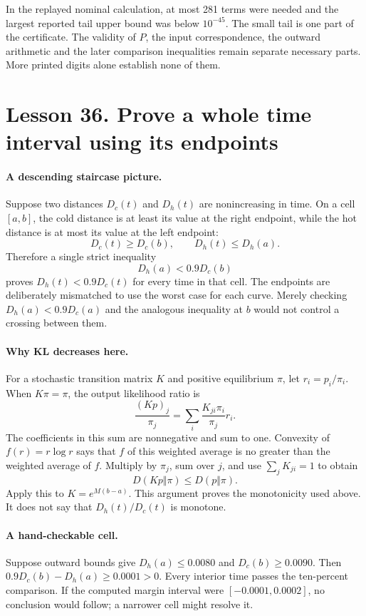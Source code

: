 \documentclass[11pt]{article}
\begin{document}
In the replayed nominal calculation, at most 281 terms were needed and the
largest reported tail upper bound was below $10^{-45}$. The small tail is
one part of the certificate. The validity of $P$, the input correspondence,
the outward arithmetic and the later comparison inequalities remain
separate necessary parts. More printed digits alone establish none of them.

\section*{Lesson 36. Prove a whole time interval using its endpoints}
\paragraph{A descending staircase picture.}
Suppose two distances $D_c(t)$ and $D_h(t)$ are nonincreasing in time.
On a cell $[a,b]$, the cold distance is at least its value at the right
endpoint, while the hot distance is at most its value at the left endpoint:
\[
 D_c(t)\geq D_c(b),\qquad D_h(t)\leq D_h(a).
\]
Therefore a single strict inequality
\[
 D_h(a)<0.9D_c(b)
\]
proves $D_h(t)<0.9D_c(t)$ for every time in that cell.
The endpoints are deliberately mismatched to use the worst case for each
curve. Merely checking $D_h(a)<0.9D_c(a)$ and the analogous inequality at
$b$ would not control a crossing between them.

\paragraph{Why KL decreases here.}
For a stochastic transition matrix $K$ and positive equilibrium $\pi$,
let $r_i=p_i/\pi_i$. When $K\pi=\pi$, the output likelihood ratio is
\[
 \frac{(Kp)_j}{\pi_j}=\sum_i\frac{K_{ji}\pi_i}{\pi_j}r_i.
\]
The coefficients in this sum are nonnegative and sum to one. Convexity of
$f(r)=r\log r$ says that $f$ of this weighted average is no greater than
the weighted average of $f$. Multiply by $\pi_j$, sum over $j$, and use
$\sum_jK_{ji}=1$ to obtain
\[
 D(Kp\Vert\pi)\leq D(p\Vert\pi).
\]
Apply this to $K=e^{M(b-a)}$. This argument proves the monotonicity used
above. It does not say that $D_h(t)/D_c(t)$ is monotone.

\paragraph{A hand-checkable cell.}
Suppose outward bounds give $D_h(a)\leq0.0080$ and
$D_c(b)\geq0.0090$. Then $0.9D_c(b)-D_h(a)\geq0.0001>0$.
Every interior time passes the ten-percent comparison. If the computed
margin interval were $[-0.0001,0.0002]$, no conclusion would follow;
a narrower cell might resolve it.
\end{document}
